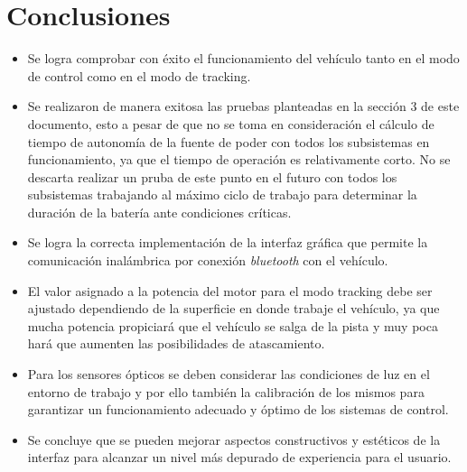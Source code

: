 \section{Conclusiones}
\begin{itemize}
    \item Se logra comprobar con éxito el funcionamiento del vehículo tanto en el modo de control como en el modo de tracking.
    
    \item Se realizaron de manera exitosa las pruebas planteadas en la sección 3 de este documento, esto a pesar de que no se toma en consideración el cálculo de tiempo de autonomía de la fuente de poder con todos los subsistemas en funcionamiento, ya que el tiempo de operación es relativamente corto. No se descarta realizar un pruba de este punto en el futuro con todos los subsistemas trabajando al máximo ciclo de trabajo para determinar la duración de la batería ante condiciones críticas.
     
    \item Se logra la correcta implementación de la interfaz gráfica que permite la comunicación inalámbrica por conexión \textit{bluetooth} con el vehículo.
    
    \item El valor asignado a la potencia del motor para el modo tracking debe ser ajustado dependiendo de la superficie en donde trabaje el vehículo, ya que mucha potencia propiciará que el vehículo se salga de la pista y muy poca hará que aumenten las posibilidades de atascamiento.
    
    \item Para los sensores ópticos se deben considerar las condiciones de luz en el entorno de trabajo y por ello también la calibración de los mismos para garantizar un funcionamiento adecuado y óptimo de los sistemas de control.
     
    \item Se concluye  que se pueden mejorar aspectos constructivos y estéticos de la interfaz para alcanzar un nivel más depurado de experiencia para el usuario. 
\end{itemize}
